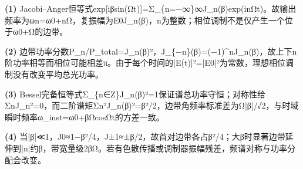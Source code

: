 \par\noindent\textbf{(1)} Jacobi–Anger恒等式exp[iβsin(Ωt)]=Σ\_\{n=−∞\}∞J\_n(β)exp(inΩt)。故输出频率为ωn=ω0+nΩ，复振幅为E0J\_n(β)，n为整数；相位调制不是仅产生一个位于ω0+Ω的边带。
\par\noindent\textbf{(2)} 边带功率分数P\_n/P\_total=J\_n(β)²，J\_\{−n\}(β)=(−1)\textasciicircum{}nJ\_n(β)，故上下n阶功率相等而相位可能相差π。由于每个时间的|E(t)|²=|E0|²为常数，理想相位调制没有改变平均总光功率。
\par\noindent\textbf{(3)} Bessel完备恒等式Σ\_\{n∈Z\}J\_n(β)²=1保证谱总功率守恒；对称性给ΣnJ\_n²=0，而二阶谱矩Σn²J\_n(β)²=β²/2，边带角频率标准差为Ω|β|/√2，与时域瞬时频率ω\_inst=ω0+βΩcosΩt的方差一致。
\par\noindent\textbf{(4)} 当|β|≪1，J0≈1−β²/4，J±1≈±β/2，故首对边带各占β²/4；大β时显著边带延伸到|n|约β，带宽量级2βΩ。若有色散传播或调制器振幅残差，频谱对称与功率分配会改变。
